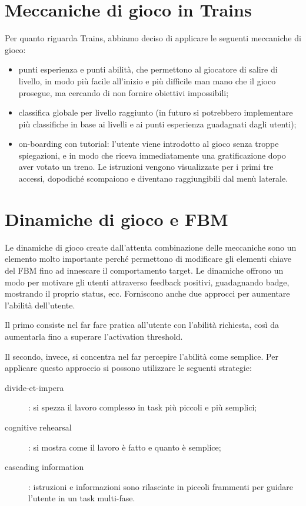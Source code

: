 \section{Meccaniche di gioco in Trains\label{sec:meccaniche-app}}
Per quanto riguarda Trains, abbiamo deciso di applicare le seguenti meccaniche di gioco:
\begin{itemize}
    \item punti esperienza e punti abilità, che permettono al giocatore di salire di livello, in modo più facile all'inizio e più difficile man mano che il gioco prosegue, ma cercando di non fornire obiettivi impossibili;
    \item classifica globale per livello raggiunto (in futuro si potrebbero implementare più classifiche in base ai livelli e ai punti esperienza guadagnati dagli utenti);
    \item on-boarding con tutorial: l'utente viene introdotto al gioco senza troppe spiegazioni, e in modo che riceva immediatamente una gratificazione dopo aver votato un treno. Le istruzioni vengono visualizzate per i primi tre accessi, dopodiché scompaiono e diventano raggiungibili dal menù laterale.
\end{itemize}

\section{Dinamiche di gioco e FBM\label{sec:dinamiche-fbm}}

Le dinamiche di gioco create dall'attenta combinazione delle meccaniche sono un elemento molto importante perché permettono di modificare gli elementi chiave del FBM fino ad innescare il comportamento target.
Le dinamiche offrono un modo per motivare gli utenti attraverso feedback positivi, guadagnando badge, mostrando il proprio status, ecc. Forniscono anche due approcci per aumentare l'abilità dell'utente.

Il primo consiste nel far fare pratica all'utente con l'abilità richiesta, così da aumentarla fino a superare l'activation threshold.

Il secondo, invece, si concentra nel far percepire l'abilità come semplice. Per applicare questo  approccio si possono utilizzare le seguenti strategie:
\begin{description}
    \item[divide-et-impera]: si spezza il lavoro complesso in task più piccoli e più semplici;
    \item[cognitive rehearsal]: si mostra come il lavoro è fatto e quanto è semplice;
    \item[cascading information]: istruzioni e informazioni sono rilasciate in piccoli frammenti per guidare l'utente in un task multi-fase.
\end{description}

